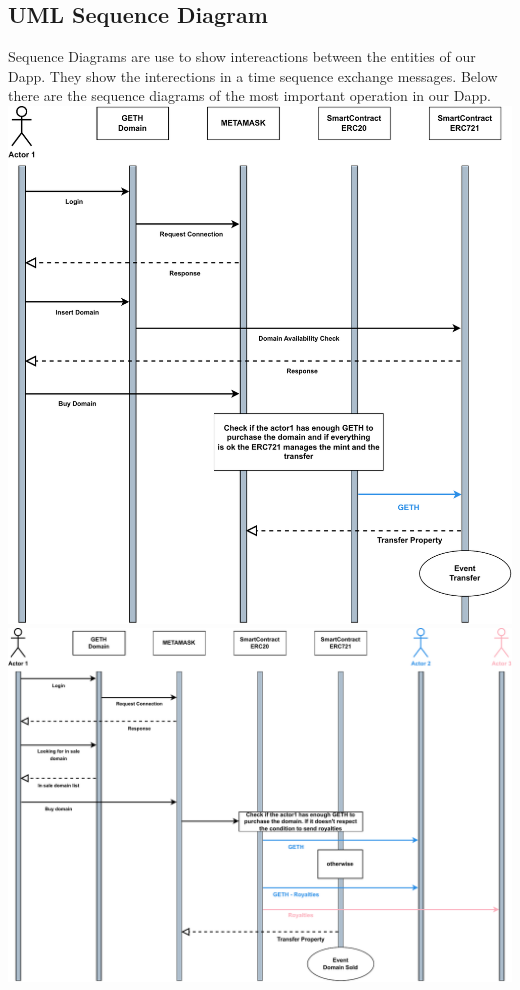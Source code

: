 \documentclass[main.tex]{subfiles}
\begin{document}
\subsection{UML Sequence Diagram}
Sequence Diagrams are use to show intereactions between the entities of our Dapp. They show the interections in a time sequence exchange messages. Below there are the sequence diagrams of the most important operation in our Dapp.\\

\includegraphics[width=0.7\linewidth]{figures/PurchaseNewDomain.pdf}\\
\includegraphics[width=0.8\linewidth]{figures/UnioneBuy.drawio.pdf}\\

\end{document}
